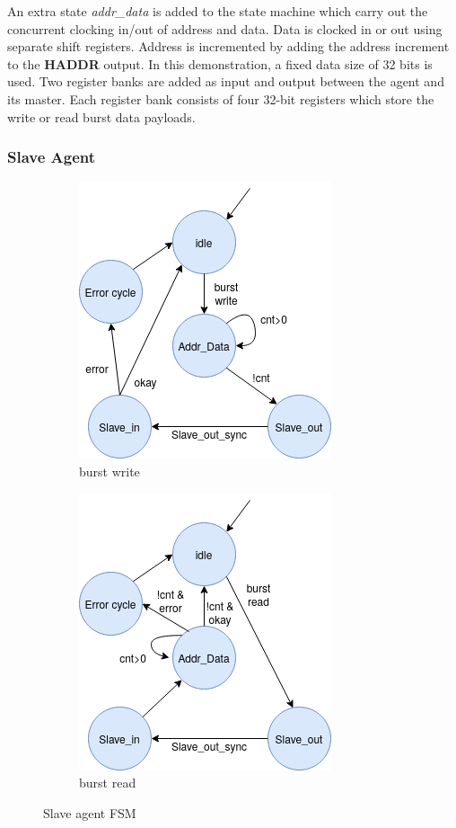 An extra state \textit{addr\_data} is added to the state machine which carry out the concurrent clocking in/out of address and data. Data is clocked in or out using separate shift registers. Address is incremented by adding the address increment to the \textbf{HADDR} output. In this demonstration, a fixed data size of 32 bits is used. Two register banks are added as input and output between the agent and its master. Each register bank consists of four 32-bit registers which store the write or read burst data payloads. 

\subsubsection{Slave Agent}
\begin{figure}[hbt]
 \centering
 \begin{subfigure}[b]{0.4\linewidth}
 \includegraphics[width=0.7\linewidth]{figs/hw/sAgent_wburstfsm.png}
 \caption{burst write}
 \end{subfigure}
 \begin{subfigure}[b]{0.4\linewidth}
 \includegraphics[width=0.7\linewidth]{figs/hw/sAgent_rburstfsm.png}
 \caption{burst read}
 \end{subfigure}
\caption{Slave agent FSM}
\label{fig:sagt-burstfsm}
\end{figure}

